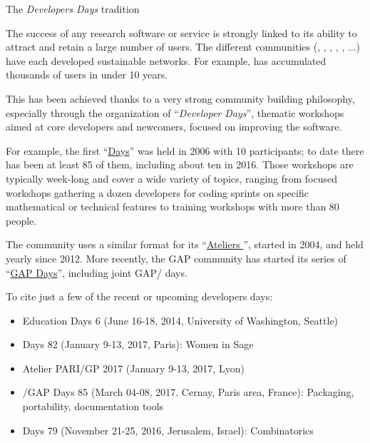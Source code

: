 \documentclass[12pt]{amsart}
\makeatletter
\def\subsection{\@startsection{subsection}{2}%
  \z@{.3\linespacing\@plus.5\linespacing}{.1\linespacing}%
  {\normalfont\bfseries}}
\makeatother
\begin{document}

\subsection{The \emph{Developers Days} tradition}

The success of any research software or service is strongly linked to
its ability to attract and retain a large number of users. The
different communities (\Sage, \GAP, \Pari, \Singular, \Jupyter, ...)
have each developed sustainable networks. For example, \Sage has
accumulated thousands of users in under 10 years.

This has been achieved thanks to a very strong community building
philosophy, especially through the organization of ``\emph{Developer
  Days}'', thematic workshops aimed at core developers and newcomers,
focused on improving the software.

For example, the first
``\href{https://wiki.sagemath.org/Workshops}{\Sage Days}'' was held in
2006 with 10 participants; to date there has been at least 85 of them,
including about ten in 2016. Those workshops are typically week-long
and cover a wide variety of topics, ranging from focused workshops
gathering a dozen developers for coding sprints on specific
mathematical or technical features to training workshops with more
than 80 people.

The \PariGP community uses a similar format for its
``\href{http://pari.math.u-bordeaux.fr/ateliers.html}{Ateliers
  \PariGP}'', started in 2004, and held yearly since 2012. More
recently, the GAP community has started its series of
``\href{http://gapdays.de/}{GAP Days}'', including joint GAP/\Sage
days.

To cite just a few of the recent or upcoming developers days:

\begin{itemize}
\item \Sage Education Days 6 (June 16-18, 2014, University of
  Washington, Seattle)
\item \Sage Days 82 (January 9-13, 2017, Paris): Women in Sage
\item Atelier PARI/GP 2017 (January 9-13, 2017, Lyon)
\item \Sage/GAP Days 85  (March 04-08, 2017. Cernay, Paris area, France):
  Packaging, portability, documentation tools
\item \Sage Days 79 (November 21-25, 2016, Jerusalem, Israel): Combinatorics
\end{itemize}
\end{document}
